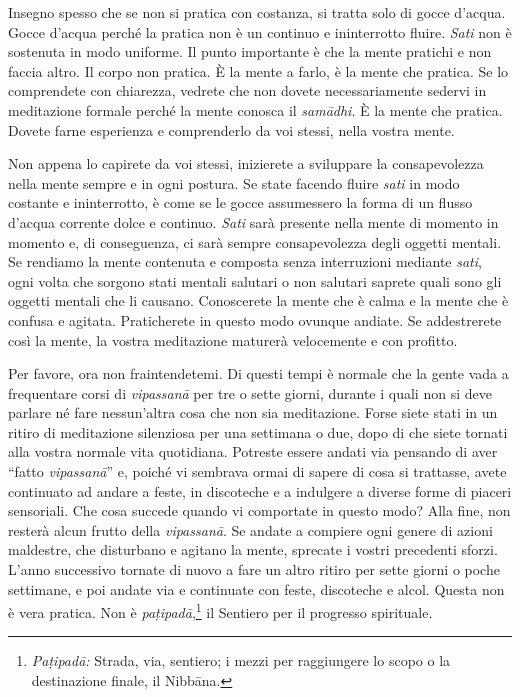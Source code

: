 Insegno spesso che se non si pratica con costanza, si tratta solo di
gocce d'acqua. Gocce d'acqua perché la pratica non è un continuo e
ininterrotto fluire. \emph{Sati} non è sostenuta in modo uniforme. Il
punto importante è che la mente pratichi e non faccia altro. Il corpo
non pratica. È la mente a farlo, è la mente che pratica. Se lo
comprendete con chiarezza, vedrete che non dovete necessariamente
sedervi in meditazione formale perché la mente conosca il
\emph{samādhi}. È la mente che pratica. Dovete farne esperienza e
comprenderlo da voi stessi, nella vostra mente.

Non appena lo capirete da voi stessi, inizierete a sviluppare la
consapevolezza nella mente sempre e in ogni postura. Se state facendo
fluire \emph{sati} in modo costante e ininterrotto, è come se le gocce
assumessero la forma di un flusso d'acqua corrente dolce e continuo.
\emph{Sati} sarà presente nella mente di momento in momento e, di
conseguenza, ci sarà sempre consapevolezza degli oggetti mentali. Se
rendiamo la mente contenuta e composta senza interruzioni mediante
\emph{sati}, ogni volta che sorgono stati mentali salutari o non
salutari saprete quali sono gli oggetti mentali che li causano.
Conoscerete la mente che è calma e la mente che è confusa e agitata.
Praticherete in questo modo ovunque andiate. Se addestrerete così la
mente, la vostra meditazione maturerà velocemente e con profitto.

Per favore, ora non fraintendetemi. Di questi tempi è normale che la
gente vada a frequentare corsi di \emph{vipassanā} per tre o sette
giorni, durante i quali non si deve parlare né fare nessun'altra cosa
che non sia meditazione. Forse siete stati in un ritiro di meditazione
silenziosa per una settimana o due, dopo di che siete tornati alla
vostra normale vita quotidiana. Potreste essere andati via pensando di
aver ``fatto \emph{vipassanā}'' e, poiché vi sembrava ormai di sapere di
cosa si trattasse, avete continuato ad andare a feste, in discoteche e a
indulgere a diverse forme di piaceri sensoriali. Che cosa succede quando
vi comportate in questo modo? Alla fine, non resterà alcun frutto della
\emph{vipassanā}. Se andate a compiere ogni genere di azioni maldestre,
che disturbano e agitano la mente, sprecate i vostri precedenti sforzi.
L'anno successivo tornate di nuovo a fare un altro ritiro per sette
giorni o poche settimane, e poi andate via e continuate con feste,
discoteche e alcol. Questa non è vera pratica. Non è
\emph{paṭipadā},\footnote{\emph{Paṭipadā:} Strada, via, sentiero; i
  mezzi per raggiungere lo scopo o la destinazione finale, il
  Nibbāna.} il Sentiero per il progresso spirituale.

